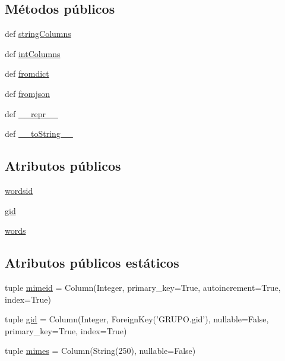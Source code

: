 \subsection*{Métodos públicos}
\begin{DoxyCompactItemize}
\item 
def \hyperlink{classdb__layer_1_1_m_i_m_e_s_a507d01e47453b187461ccf737326e8de}{string\-Columns}
\item 
def \hyperlink{classdb__layer_1_1_m_i_m_e_s_a790fe339535f598d08ef553311075518}{int\-Columns}
\item 
def \hyperlink{classdb__layer_1_1_m_i_m_e_s_a08eafc4a1c69df96fa32d4f1c65cb04f}{fromdict}
\item 
def \hyperlink{classdb__layer_1_1_m_i_m_e_s_a4ec1674ef68ad1844d2afe45259bdc89}{fromjson}
\item 
def \hyperlink{classdb__layer_1_1_m_i_m_e_s_a76e9016c987bbe373eeb0416a35a4e51}{\-\_\-\-\_\-repr\-\_\-\-\_\-}
\item 
def \hyperlink{classdb__layer_1_1_m_i_m_e_s_a4101e5315f081b7675139e1c5eaa7db0}{\-\_\-\-\_\-to\-String\-\_\-\-\_\-}
\end{DoxyCompactItemize}
\subsection*{Atributos públicos}
\begin{DoxyCompactItemize}
\item 
\hyperlink{classdb__layer_1_1_m_i_m_e_s_a5dd5df331308d3e58b82811885724468}{wordsid}
\item 
\hyperlink{classdb__layer_1_1_m_i_m_e_s_a66f384fb971ec6f4d83f511e3fca7b7b}{gid}
\item 
\hyperlink{classdb__layer_1_1_m_i_m_e_s_a636fc98e28fedf6a5eb57058e2d402d8}{words}
\end{DoxyCompactItemize}
\subsection*{Atributos públicos estáticos}
\begin{DoxyCompactItemize}
\item 
tuple \hyperlink{classdb__layer_1_1_m_i_m_e_s_a66872c780c00042cd689fd6b0d2028df}{mimeid} = Column(Integer, primary\-\_\-key=True, autoincrement=True, index=True)
\item 
tuple \hyperlink{classdb__layer_1_1_m_i_m_e_s_a3ce87f789dd363c1a497bf44144ef051}{gid} = Column(Integer, Foreign\-Key('G\-R\-U\-P\-O.\-gid'), nullable=False, primary\-\_\-key=True, index=True)
\item 
tuple \hyperlink{classdb__layer_1_1_m_i_m_e_s_a0161e97244015d5d5828ef162f621897}{mimes} = Column(String(250), nullable=False)
\end{DoxyCompactItemize}


